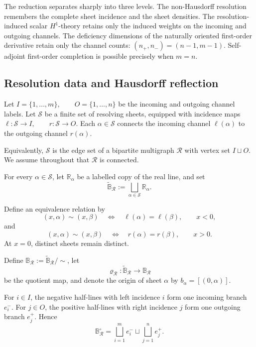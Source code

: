 \documentclass[11pt]{article}
\theoremstyle{plain}
\theoremstyle{definition}
\begin{document}
The reduction separates sharply into three levels. The non-Hausdorff
resolution remembers the complete sheet incidence and the sheet densities.
The resolution-induced scalar \(H^1\)-theory retains only the induced weights on the
incoming and outgoing channels. The deficiency dimensions of the naturally
oriented first-order derivative retain only the channel counts:
\((n_+,n_-) = (n-1,m-1)\).
Self-adjoint first-order completion is possible precisely when
\(m=n\).

\subsection{Resolution data and Hausdorff reflection}
\label{subsec:Bmn-resolution-data}
\label{subsec:Bmn-smooth-structure}
\label{subsec:Bmn-reflection}

Let \(I=\{1,\ldots,m\}, \qquad O=\{1,\ldots,n\}\) be the incoming and outgoing channel labels. Let \(\mathcal S\) be a finite set of resolving sheets, equipped with incidence maps
\(\ell:\mathcal S\longrightarrow I, \qquad r:\mathcal S\longrightarrow O\).
Each \(\alpha\in\mathcal S\) connects the incoming channel \(\ell(\alpha)\) to the outgoing channel
\(r(\alpha)\).

Equivalently, \(\mathcal S\) is the edge set of a bipartite multigraph \(\mathcal R\) with vertex set
\(I\sqcup O\).
We assume throughout that \(\mathcal R\) is connected.

For every \(\alpha\in\mathcal S\), let \(\mathbb R_\alpha\) be a labelled copy of the real line, and set
\[
  \widetilde{\mathbb B}_{\mathcal R}
  :=
  \bigsqcup_{\alpha\in\mathcal S}
  \mathbb R_\alpha.
\]

Define an equivalence relation by
\[
  (x,\alpha)\sim(x,\beta)
  \quad\Longleftrightarrow\quad
  \ell(\alpha)=\ell(\beta),
  \qquad
  x<0,
\]
and
\[
  (x,\alpha)\sim(x,\beta)
  \quad\Longleftrightarrow\quad
  r(\alpha)=r(\beta),
  \qquad
  x>0.
\]
At \(x=0\), distinct sheets remain distinct.

Define
\(\mathbb B_{\mathcal R} := \widetilde{\mathbb B}_{\mathcal R}/\!\sim\),
let
\[
  \varrho_{\mathcal R}:
  \widetilde{\mathbb B}_{\mathcal R}
  \longrightarrow
  \mathbb B_{\mathcal R}
\]
be the quotient map, and denote the origin of sheet \(\alpha\) by
\(b_\alpha=[(0,\alpha)]\).

For \(i\in I\), the negative half-lines with left incidence \(i\) form one
incoming branch
\(e_i^-\).
For \(j\in O\), the positive half-lines with right incidence \(j\) form one
outgoing branch
\(e_j^+\).
Hence
\[
  \mathbb B_{\mathcal R}^{\circ}
  =
  \bigsqcup_{i=1}^{m}e_i^-
  \sqcup
  \bigsqcup_{j=1}^{n}e_j^+.
\]
\end{document}
